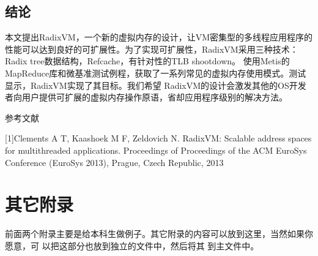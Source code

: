 \section{结论}
本文提出RadixVM，一个新的虚拟内存的设计，让VM密集型的多线程应用程序的性能可以达到良好的可扩展性。为了实现可扩展性，RadixVM采用三种技术：Radix
tree数据结构，Refcache，有针对性的TLB
shootdown。
使用Metis的MapReduce库和微基准测试例程，获取了一系列常见的虚拟内存使用模式。测试显示，RadixVM实现了其目标。我们希望
RadixVM的设计会激发其他的OS开发者向用户提供可扩展的虚拟内存操作原语，省却应用程序级别的解决方法。

\begin{center}
参考文献
\end{center}
[1]\hspace{15pt}Clements A T, Kaashoek M F, Zeldovich N. RadixVM: Scalable address spaces for multithreaded applications. Proceedings of Proceedings of the ACM EuroSys Conference (EuroSys 2013), Prague, Czech Republic, 2013


\chapter{其它附录}
前面两个附录主要是给本科生做例子。其它附录的内容可以放到这里，当然如果你愿意，可
以把这部分也放到独立的文件中，然后将其 \verb|| 到主文件中。
